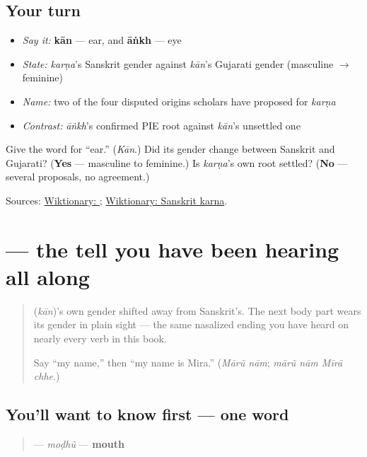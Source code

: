 \subsection*{Your turn}
\begin{itemize}
\raggedright
  \item \emph{Say it:} \textbf{kān} — ear, and \textbf{āṅkh} — eye
  \item \emph{State:} \emph{karṇa}'s Sanskrit gender against \emph{kān}'s Gujarati gender (masculine $\to$ feminine)
  \item \emph{Name:} two of the four disputed origins scholars have proposed for \emph{karṇa}
  \item \emph{Contrast:} \emph{āṅkh}'s confirmed PIE root against \emph{kān}'s unsettled one
\end{itemize}

\begin{tcolorbox}[breakable,colback=teal!4,colframe=teal!35!black,title={Before you move on}]
Give the word for \textquotedblleft{}ear.\textquotedblright{} (\emph{Kān}.) Did its gender change between Sanskrit and Gujarati? (\textbf{Yes} — masculine to feminine.) Is \emph{karṇa}'s own root settled? (\textbf{No} — several proposals, no agreement.)

Sources: \href{https://en.wiktionary.org/wiki/\%E0\%AA\%95\%E0\%AA\%BE\%E0\%AA\%A8}{Wiktionary: }; \href{https://en.wiktionary.org/wiki/\%E0\%A4\%95\%E0\%A4\%B0\%E0\%A5\%8D\%E0\%A4\%A3}{Wiktionary: Sanskrit karna}.
\end{tcolorbox}
\section[\texorpdfstring{\gu{મોઢું} (moḍhũ)}{મોઢું (moḍhũ)}]{ — the tell you have been hearing all along}

\label{lesson:GU-C12-modhu}



\begin{quote}
\textbf{} (\emph{kān})'s own gender shifted away from Sanskrit's. The next body part wears its gender in plain sight — the same nasalized ending you have heard on nearly every verb in this book.

Say \textquotedblleft{}my name,\textquotedblright{} then \textquotedblleft{}my name is Mira.\textquotedblright{} (\emph{Mārũ nām}; \emph{mārũ nām Mīrā chhe}.)
\end{quote}

\subsection*{You'll want to know first — one word}
\begin{quote}
\textbf{} — \emph{moḍhũ} — \textbf{mouth}
\end{quote}

